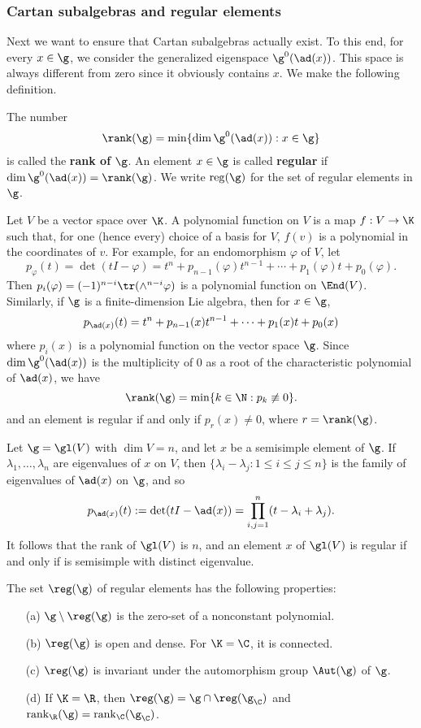 \subsubsection{Cartan subalgebras and regular elements}
Next we want to ensure that Cartan subalgebras actually exist. To this end, for every $x\in\g$, we consider the generalized eigenspace $\g^0(\ad(x))$. This space is always different from zero since it obviously contains $x$. We make the following definition.
\begin{definition}
The number
\begin{align}\label{Lie algebra regular element def}
\rank(\g)=\min\{\dim\g^0(\ad(x)):x\in\g\}
\end{align}
is called the \textbf{rank of $\g$}. An element $x\in\g$ is called \textbf{regular} if $\dim\g^0(\ad(x))=\rank(\g)$. We write $\mathrm{reg}(\g)$ for the set of regular elements in $\g$.
\end{definition}
Let $V$ be a vector space over $\K$. A polynomial function on $V$ is a map $f:V\to\K$ such that, for one (hence every) choice of a basis for $V$, $f(v)$ is a polynomial in the coordinates of $v$. For example, for an endomorphism $\varphi$ of $V$, let
\[p_\varphi(t)=\det(tI-\varphi)=t^n+p_{n-1}(\varphi)t^{n-1}+\cdots+p_1(\varphi)t+p_0(\varphi).\]
Then $p_i(\varphi)=(-1)^{n-i}\tr(\wedge^{n-i}\varphi)$ is a polynomial function on $\End(V)$. Similarly, if $\g$ is a finite-dimension Lie algebra, then for $x\in\g$,
\[p_{\ad(x)}(t)=t^n+p_{n-1}(x)t^{n-1}+\cdots+p_1(x)t+p_0(x)\]
where $p_i(x)$ is a polynomial function on the vector space $\g$. Since $\dim\g^0(\ad(x))$ is the multiplicity of $0$ as a root of the characteristic polynomial of $\ad(x)$, we have
\[\rank(\g)=\min\{k\in\N:p_k\not\equiv 0\}.\]
and an element is regular if and only if $p_{r}(x)\neq 0$, where $r=\rank(\g)$.
\begin{example}
Let $\g=\gl(V)$ with $\dim V=n$, and let $x$ be a semisimple element of $\g$. If $\lambda_1,\dots,\lambda_n$ are eigenvalues of $x$ on $V$, then $\{\lambda_i-\lambda_j:1\leq i\leq j\leq n\}$ is the family of eigenvalues of $\ad(x)$ on $\g$, and so
\[p_{\ad(x)}(t):=\det(tI-\ad(x))=\prod_{i,j=1}^{n}(t-\lambda_i+\lambda_j).\]
It follows that the rank of $\gl(V)$ is $n$, and an element $x$ of $\gl(V)$ is regular if and only if is semisimple with distinct eigenvalue.
\end{example}
\begin{lemma}\label{Lie algebra regular element prop}
The set $\reg(\g)$ of regular elements has the following properties:
\begin{itemize}
\item[(a)] $\g\setminus\reg(\g)$ is the zero-set of a nonconstant polynomial.
\item[(b)] $\reg(\g)$ is open and dense. For $\K=\C$, it is connected.
\item[(c)] $\reg(\g)$ is invariant under the automorphism group $\Aut(\g)$ of $\g$.
\item[(d)] If $\K=\R$, then $\reg(\g)=\g\cap\reg(\g_{\C})$ and $\mathrm{rank}_{\R}(\g)=\mathrm{rank}_{\C}(\g_{\C})$.
\end{itemize}
\end{lemma}
